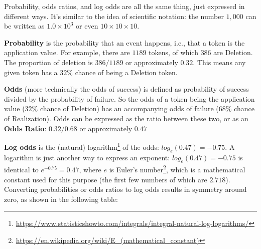 \documentclass[
  10pt,
  letterpaper]{article}
\renewcommand\texttt[1]{{\ttfamily\color{BrickRed}#1}}
\DeclareRobustCommand{\href}[2]{#2\footnote{\url{#1}}}
\begin{document}
\begin{tcolorbox}[enhanced jigsaw, colbacktitle=quarto-callout-note-color!10!white, left=2mm, breakable, opacityback=0, toprule=.15mm, titlerule=0mm, bottomtitle=1mm, colframe=quarto-callout-note-color-frame, opacitybacktitle=0.6, coltitle=black, leftrule=.75mm, toptitle=1mm, rightrule=.15mm, title=\textcolor{quarto-callout-note-color}{\faInfo}\hspace{0.5em}{Probability, Odds Ratios \& Logg Odds}, bottomrule=.15mm, colback=white, arc=.35mm]

Probability, odds ratios, and log odds are all the same thing, just
expressed in different ways. It's similar to the idea of scientific
notation: the number \(1,000\) can be written as \(1.0\times 10^3\) or
even \(10\times 10\times 10\).

\textbf{Probability} is the probability that an event happens, i.e.,
that a token is the application value. For example, there are \(1189\)
tokens, of which \(386\) are \texttt{Deletion}. The proportion of
deletion is \(386/1189\) or approximately \(0.32\). This means any given
token has a \(32\%\) chance of being a \texttt{Deletion} token.

\textbf{Odds} (more technically the odds of success) is defined as
probability of success divided by the probability of failure. So the
odds of a token being the application value (\(32\%\) chance of
\texttt{Deletion}) has an accompanying odds of failure (\(68\%\) chance
of \texttt{Realization}). Odds can be expressed as the ratio between
these two, or as an \textbf{Odds Ratio}: \(0.32/0.68\) or approximately
\(0.47\)

\textbf{Log odds} is the (natural)
\href{https://www.statisticshowto.com/integrals/integral-natural-log-logarithms/}{logarithm}
of the odds: \(log_e(0.47) = -0.75\). A logarithm is just another way to
express an exponent: \(log_e(0.47) = -0.75\) is identical to
\(e^{-0.75} = 0.47\), where \(e\) is
\href{https://en.wikipedia.org/wiki/E_(mathematical_constant)}{Euler's
number}, which is a mathematical constant used for this purpose (the
first few numbers of which are \(2.718\)). Converting probabilities or
odds ratios to log odds results in symmetry around zero, as shown in the
following table:


\end{tcolorbox}
\end{document}
